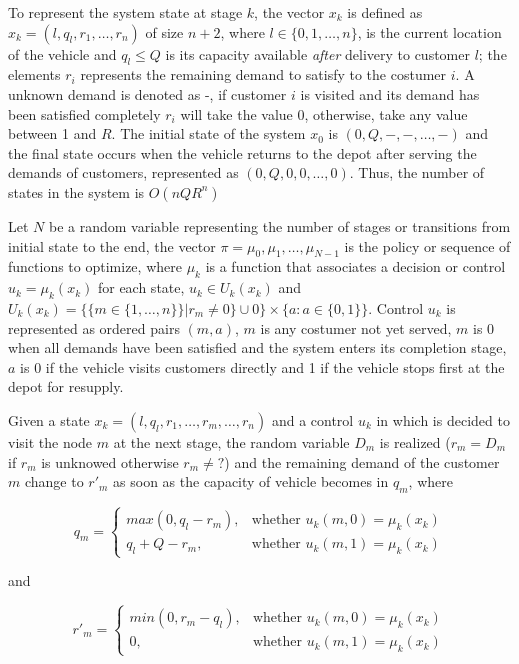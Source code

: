 To represent the system state at stage $k$, the vector $x_k$ is defined as $x_k=(l,q_l, r_1,\ldots,r_n)$ of size $n+2$, where $l \in \{0,1,\ldots,n\}$, is the current location of the vehicle and $q_l \leq Q$ is its capacity available \textit{after} delivery to customer $l$; the elements $r_i$ represents the remaining demand to satisfy to the costumer $i$. A unknown demand is denoted as -, if customer $i$ is visited and its demand has been satisfied completely $r_i$ will take the value 0, otherwise, take any value between 1 and $R$. The initial state of the system $x_0$ is $(0,Q,-,-,\ldots,-)$ and the final state occurs when the vehicle returns to the depot after serving the demands of customers, represented as $(0,Q,0,0,\ldots,0)$. Thus, the number of states in the system is $O(nQR^n)$

Let $N$ be a random variable representing the number of stages or transitions from initial state to the end, the vector $\pi = {\mu_0, \mu_1,\ldots, \mu_{N-1}}$ is the policy or sequence of functions to optimize, where $\mu_k$ is a function that associates a decision or control $u_k=\mu_k(x_k)$ for each state, $u_k \in U_k(x_k)$ and $U_k(x_k) = \{\{m \in \{1,\ldots,n\}\}|r_m\neq0\}\cup 0\} \times \{a:a \in \{0,1\}\}$. Control $u_k$ is represented as ordered pairs $(m,a)$, $m$ is any costumer not yet served, $m$ is 0 when all demands have been satisfied and the system enters its completion stage, $a$ is 0 if the vehicle visits customers directly and 1 if the vehicle stops first at the depot for resupply.

Given a state $x_k=(l,q_l,r_1,\ldots,r_m,\ldots,r_n)$ and a control $u_k$ in which is decided to visit the node $m$ at the next stage, the random variable $D_m$ is realized ($r_m = D_m$ if $r_m$ is unknowed otherwise $r_m \neq ?$) and the remaining demand of the customer $m$ change to $r'_m$ as soon as the capacity of vehicle becomes in $q_m$, where

\begin{equation}\label{eq:q_m}
    q_m = \left \{ \begin{array}{ll}
    max(0,q_l-r_m), & \text{whether } u_k(m,0)=\mu_k(x_k)\\
    q_l+Q-r_m, & \text{whether } u_k(m,1)=\mu_k(x_k)
    \end{array} \right.
 \end{equation}

and

\begin{equation}\label{eq:r_m}
    r'_m = \left \{ \begin{array}{ll}
    min(0,r_m - q_l), & \text{whether } u_k(m,0)=\mu_k(x_k)\\
    0, & \text{whether } u_k(m,1)=\mu_k(x_k)
    \end{array} \right.
 \end{equation}

